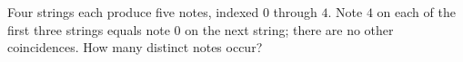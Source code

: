Four strings each produce five notes, indexed $0$ through $4$. Note $4$ on each of the first three strings equals note $0$ on the next string; there are no other coincidences. How many distinct notes occur?
